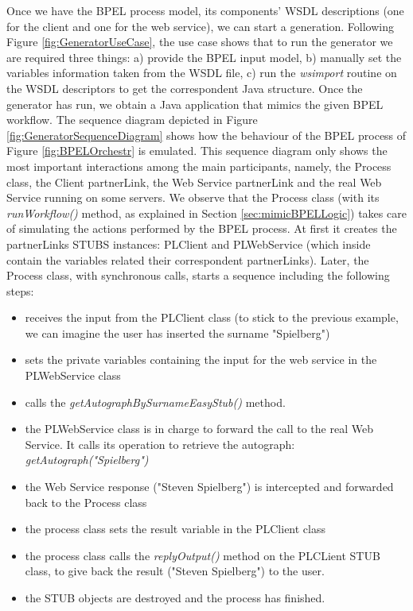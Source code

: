 Once we have the BPEL process model, its components' WSDL descriptions (one for the client and one for the web service), we can start a generation. Following Figure \ref{fig:GeneratorUseCase}, the use case shows that to run the generator we are required three things: a) provide the BPEL input model, b) manually set the variables information taken from the WSDL file, c) run the \textit{wsimport} routine on the WSDL descriptors to get the correspondent Java structure.
Once the generator has run, we obtain a Java application that mimics the given BPEL workflow. The sequence diagram depicted in Figure \ref{fig:GeneratorSequenceDiagram} shows how the behaviour of the BPEL process of Figure \ref{fig:BPELOrchestr} is emulated. This sequence diagram only shows the most important interactions among the main participants, namely, the Process class, the Client partnerLink, the Web Service partnerLink and the real Web Service running on some servers. 
We observe that the Process class (with its \textit{runWorkflow()} method, as explained in Section \ref{sec:mimicBPELLogic}) takes care of simulating the actions performed by the BPEL process. At first it creates the partnerLinks STUBS instances: PLClient and PLWebService (which inside contain the variables related their correspondent partnerLinks). Later, the Process class, with synchronous calls, starts a sequence including the following steps:
\begin{itemize}
 \item receives the input from the PLClient class (to stick to the previous example, we can imagine the user has inserted the surname "Spielberg")
 \item sets the private variables containing the input for the web service in the PLWebService class
 \item calls the \textit{getAutographBySurnameEasyStub()} method.
 \item the PLWebService class is in charge to forward the call to the real Web Service. It calls its operation to retrieve the autograph: \textit{getAutograph("Spielberg")}
 \item the Web Service response ("Steven Spielberg") is intercepted and forwarded back to the Process class
 \item the process class sets the result variable in the PLClient class
 \item the process class calls the \textit{replyOutput()} method on the PLCLient STUB class, to give back the result ("Steven Spielberg") to the user.
 \item the STUB objects are destroyed and the process has finished.
\end{itemize}

